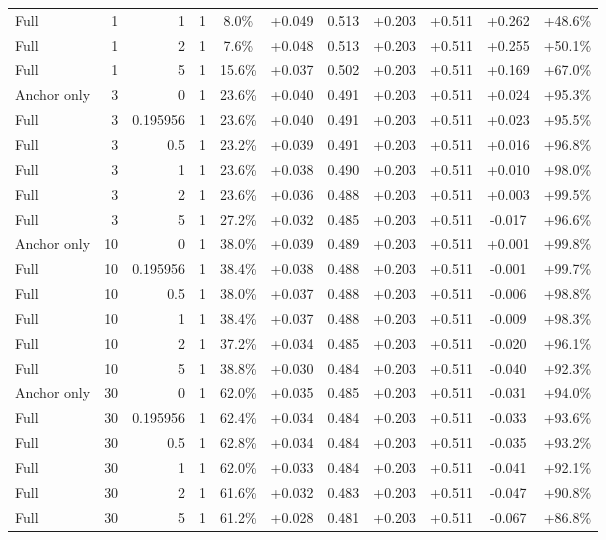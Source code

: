 \begin{table}[htbp]
\begin{tabular}{lrrrccccccc}
Full & 1 & 1 & 1 & 8.0\% & +0.049 & 0.513 & +0.203 & +0.511 & +0.262 & +48.6\% \\
Full & 1 & 2 & 1 & 7.6\% & +0.048 & 0.513 & +0.203 & +0.511 & +0.255 & +50.1\% \\
Full & 1 & 5 & 1 & 15.6\% & +0.037 & 0.502 & +0.203 & +0.511 & +0.169 & +67.0\% \\
Anchor only & 3 & 0 & 1 & 23.6\% & +0.040 & 0.491 & +0.203 & +0.511 & +0.024 & +95.3\% \\
Full & 3 & 0.195956 & 1 & 23.6\% & +0.040 & 0.491 & +0.203 & +0.511 & +0.023 & +95.5\% \\
Full & 3 & 0.5 & 1 & 23.2\% & +0.039 & 0.491 & +0.203 & +0.511 & +0.016 & +96.8\% \\
Full & 3 & 1 & 1 & 23.6\% & +0.038 & 0.490 & +0.203 & +0.511 & +0.010 & +98.0\% \\
Full & 3 & 2 & 1 & 23.6\% & +0.036 & 0.488 & +0.203 & +0.511 & +0.003 & +99.5\% \\
Full & 3 & 5 & 1 & 27.2\% & +0.032 & 0.485 & +0.203 & +0.511 & -0.017 & +96.6\% \\
Anchor only & 10 & 0 & 1 & 38.0\% & +0.039 & 0.489 & +0.203 & +0.511 & +0.001 & +99.8\% \\
Full & 10 & 0.195956 & 1 & 38.4\% & +0.038 & 0.488 & +0.203 & +0.511 & -0.001 & +99.7\% \\
Full & 10 & 0.5 & 1 & 38.0\% & +0.037 & 0.488 & +0.203 & +0.511 & -0.006 & +98.8\% \\
Full & 10 & 1 & 1 & 38.4\% & +0.037 & 0.488 & +0.203 & +0.511 & -0.009 & +98.3\% \\
Full & 10 & 2 & 1 & 37.2\% & +0.034 & 0.485 & +0.203 & +0.511 & -0.020 & +96.1\% \\
Full & 10 & 5 & 1 & 38.8\% & +0.030 & 0.484 & +0.203 & +0.511 & -0.040 & +92.3\% \\
Anchor only & 30 & 0 & 1 & 62.0\% & +0.035 & 0.485 & +0.203 & +0.511 & -0.031 & +94.0\% \\
Full & 30 & 0.195956 & 1 & 62.4\% & +0.034 & 0.484 & +0.203 & +0.511 & -0.033 & +93.6\% \\
Full & 30 & 0.5 & 1 & 62.8\% & +0.034 & 0.484 & +0.203 & +0.511 & -0.035 & +93.2\% \\
Full & 30 & 1 & 1 & 62.0\% & +0.033 & 0.484 & +0.203 & +0.511 & -0.041 & +92.1\% \\
Full & 30 & 2 & 1 & 61.6\% & +0.032 & 0.483 & +0.203 & +0.511 & -0.047 & +90.8\% \\
Full & 30 & 5 & 1 & 61.2\% & +0.028 & 0.481 & +0.203 & +0.511 & -0.067 & +86.8\% \\

\end{tabular}
\end{table}
